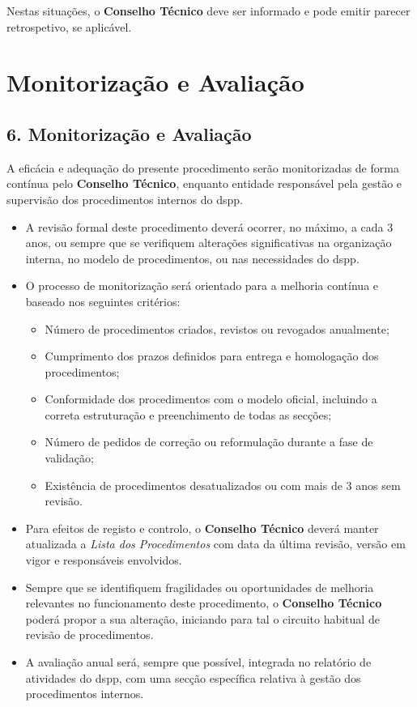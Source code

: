 Nestas situações, o \textbf{Conselho Técnico} deve ser informado e pode emitir parecer retrospetivo, se aplicável.


\section{Monitorização e Avaliação}\label{sec:monitorizacao-e-avaliacao}

\subsection*{6. Monitorização e Avaliação}

A eficácia e adequação do presente procedimento serão monitorizadas de forma contínua pelo \textbf{Conselho Técnico}, enquanto entidade responsável pela gestão e supervisão dos procedimentos internos do \gls{dspp}.

\begin{itemize}
  \item A revisão formal deste procedimento deverá ocorrer, no máximo, a cada 3 anos, ou sempre que se verifiquem alterações significativas na organização interna, no modelo de procedimentos, ou nas necessidades do \gls{dspp}.
  
  \item O processo de monitorização será orientado para a melhoria contínua e baseado nos seguintes critérios:
  \begin{itemize}
    \item Número de procedimentos criados, revistos ou revogados anualmente;
    \item Cumprimento dos prazos definidos para entrega e homologação dos procedimentos;
    \item Conformidade dos procedimentos com o modelo oficial, incluindo a correta estruturação e preenchimento de todas as secções;
    \item Número de pedidos de correção ou reformulação durante a fase de validação;
    \item Existência de procedimentos desatualizados ou com mais de 3 anos sem revisão.
  \end{itemize}

  \item Para efeitos de registo e controlo, o \textbf{Conselho Técnico} deverá manter atualizada a \textit{Lista dos Procedimentos} com data da última revisão, versão em vigor e responsáveis envolvidos.

  \item Sempre que se identifiquem fragilidades ou oportunidades de melhoria relevantes no funcionamento deste procedimento, o \textbf{Conselho Técnico} poderá propor a sua alteração, iniciando para tal o circuito habitual de revisão de procedimentos.

  \item A avaliação anual será, sempre que possível, integrada no relatório de atividades do \gls{dspp}, com uma secção específica relativa à gestão dos procedimentos internos.
\end{itemize}

